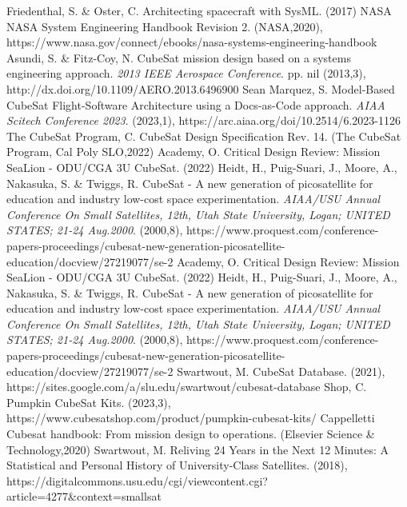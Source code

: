 \begin{thebibliography}{999}
    Friedenthal, S. \& Oster, C. Architecting spacecraft with SysML.  (2017)
    NASA NASA System Engineering Handbook Revision 2. (NASA,2020), https://www.nasa.gov/connect/ebooks/nasa-systems-engineering-handbook
    Asundi, S. \& Fitz-Coy, N. CubeSat mission design based on a systems engineering approach. {\em 2013 IEEE Aerospace Conference}. pp. nil (2013,3), http://dx.doi.org/10.1109/AERO.2013.6496900
    Sean Marquez, S. Model-Based CubeSat Flight-Software Architecture using a Docs-as-Code approach. {\em AIAA Scitech Conference 2023}. (2023,1), https://arc.aiaa.org/doi/10.2514/6.2023-1126
    The CubeSat Program, C. CubeSat Design Specification Rev. 14. (The CubeSat Program, Cal Poly SLO,2022)
    Academy, O. Critical Design Review: Mission SeaLion - ODU/CGA 3U CubeSat.  (2022)
    Heidt, H., Puig-Suari, J., Moore, A., Nakasuka, S. \& Twiggs, R. CubeSat - A new generation of picosatellite for education and industry low-cost space experimentation. {\em AIAA/USU Annual Conference On Small Satellites, 12th, Utah State University, Logan; UNITED STATES; 21-24 Aug.2000}. (2000,8), https://www.proquest.com/conference-papers-proceedings/cubesat-new-generation-picosatellite-education/docview/27219077/se-2
    Academy, O. Critical Design Review: Mission SeaLion - ODU/CGA 3U CubeSat.  (2022)
    Heidt, H., Puig-Suari, J., Moore, A., Nakasuka, S. \& Twiggs, R. CubeSat - A new generation of picosatellite for education and industry low-cost space experimentation. {\em AIAA/USU Annual Conference On Small Satellites, 12th, Utah State University, Logan; UNITED STATES; 21-24 Aug.2000}. (2000,8), https://www.proquest.com/conference-papers-proceedings/cubesat-new-generation-picosatellite-education/docview/27219077/se-2
    Swartwout, M. CubeSat Database.  (2021), https://sites.google.com/a/slu.edu/swartwout/cubesat-database
    Shop, C. Pumpkin CubeSat Kits.  (2023,3), https://www.cubesatshop.com/product/pumpkin-cubesat-kits/
    Cappelletti Cubesat handbook: From mission design to operations. (Elsevier Science \& Technology,2020)
    Swartwout, M. Reliving 24 Years in the Next 12 Minutes: A Statistical and Personal History of University-Class Satellites.  (2018), https://digitalcommons.usu.edu/cgi/viewcontent.cgi?article=4277\&context=smallsat

\end{thebibliography}
